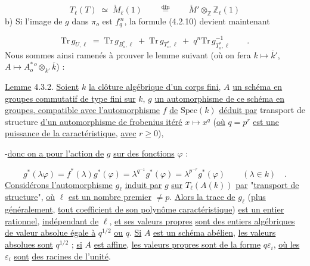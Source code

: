 \begin{equation*}
T_\ell(T) \;\simeq\; \check{M}_\ell(1) \qquad \stackrel{\mathrm{dfn}}{=} \qquad \check{M}' \otimes_{\mathbb{Z}} \mathbb{Z}_\ell(1)
\end{equation*}
b) Si l'image de $g$ dans $\pi_o$ est $f_q^{\,n}$, la formule (4.2.10) devient maintenant

\begin{equation}\tag{4.3.1}
\mathrm{Tr}\, g_{U,\ell} \;=\; \mathrm{Tr}\, g_{B^{*}_{o},\ell} \;+\; \mathrm{Tr}\, g_{T^{*}_{o},\ell} \;+\; q^{n}\mathrm{Tr}\, g^{-1}_{T^{*}_{o},\ell} \qquad .
\end{equation}
Nous sommes ainsi ramenés à prouver le lemme suivant (où on fera $k \longmapsto \overline{k}'$, $A \longmapsto A^{*\,o}_{o} \otimes_{k'} \overline{k}$) :

\underline{Lemme} 4.3.2. \underline{Soient} $k$ \underline{la clôture algébrique d'un corps fini,} $A$ \underline{un schéma en groupes commutatif de type fini sur} $k$, $g$ \underline{un automorphisme de ce schéma en groupes, compatible avec l'automorphisme} $f$ \underline{de} $\mathrm{Spec}(k)$ \underline{déduit par} transport de structure \underline{d'un automorphisme de frobenius itéré} $x \longmapsto x^q$ (\underline{où} $q = p^{r}$ \underline{est une puissance de la caractéristique}, \underline{avec} $r \geq 0$),



-\underline{donc on a pour l'action de} $g$ \underline{sur des fonctions} $\varphi$ :

\begin{equation*}
g^*(\lambda\varphi) = f^*(\lambda)g^*(\varphi) = \lambda^{q^{-1}} g^*(\varphi) = \lambda^{p^{-r}} g^*(\varphi) \qquad (\lambda \in k) \quad .
\end{equation*}
\underline{Considérons l'automorphisme} $g_\ell$ \underline{induit par} $g$ \underline{sur} $T_\ell(A(k))$ \underline{par} "\underline{transport de structure}", \underline{où} $\ell$ \underline{est un nombre premier} $\neq p$. \underline{Alors la trace de} $g_\ell$ (\underline{plus généralement}, \underline{tout coefficient de son polynôme caractéristique}) \underline{est un entier rationnel}, \underline{indépendant de} $\ell$, \underline{et ses valeurs propres} \underline{sont des entiers algébriques de valeur absolue égale à} $q^{1/2}$ \underline{ou} $q$. \underline{Si} $A$ \underline{est un schéma abélien}, \underline{les valeurs absolues sont} $q^{1/2}$ ; \underline{si} $A$ \underline{est affine}, \underline{les valeurs propres sont de la forme} $q\varepsilon_i$, \underline{où les} $\varepsilon_i$ \underline{sont} \underline{des racines de l'unité}.

